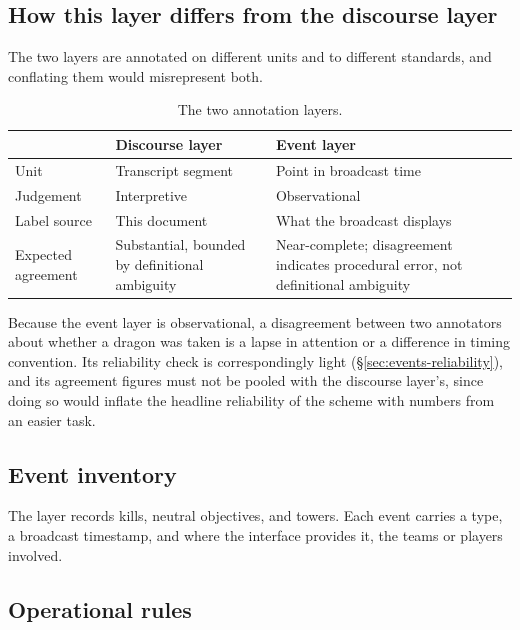\subsection{How this layer differs from the discourse layer}

The two layers are annotated on different units and to different standards, and conflating them would misrepresent both.

\begin{table}[htbp]
\centering
\small
\caption{The two annotation layers.}
\label{tab:layers}
\renewcommand{\arraystretch}{1.3}
\begin{tabularx}{\textwidth}{@{}l X X@{}}
\toprule
 & \textbf{Discourse layer} & \textbf{Event layer} \\
\midrule
Unit & Transcript segment & Point in broadcast time \\
Judgement & Interpretive & Observational \\
Label source & This document & What the broadcast displays \\
Expected agreement & Substantial, bounded by definitional ambiguity & Near-complete; disagreement indicates procedural error, not definitional ambiguity \\
\bottomrule
\end{tabularx}
\end{table}

\noindent Because the event layer is observational, a disagreement between two annotators about whether a dragon was taken is a lapse in attention or a
difference in timing convention. Its reliability check is correspondingly light (\S\ref{sec:events-reliability}), and its agreement figures must not be pooled with the discourse layer's, since doing so would inflate the headline reliability of the scheme with numbers from an easier task.

\subsection{Event inventory}

The layer records kills, neutral objectives, and towers. Each event carries a
type, a broadcast timestamp, and where the interface provides it, the teams or players involved.

\subsection{Operational rules}

